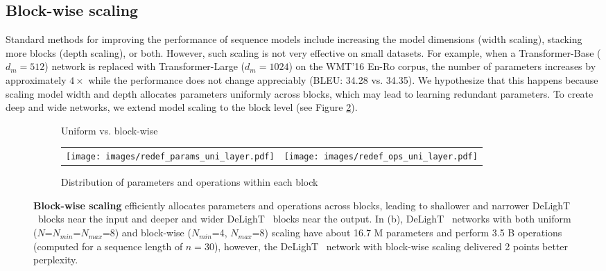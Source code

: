 \subsection{Block-wise scaling}
\label{ssec:layer_wise_scaling}
Standard methods for improving the performance of sequence models include increasing the model dimensions (width scaling), stacking more blocks (depth scaling), or both. However, such scaling is not very effective on small datasets. For example, when a Transformer-Base ($d_m=512$)  network is replaced with Transformer-Large ($d_m=1024$) on the WMT'16 En-Ro corpus, the number of parameters increases by approximately $4\times$ while the performance does not change appreciably (BLEU: 34.28 vs. 34.35). We hypothesize that this happens because scaling model width and depth allocates parameters uniformly across blocks, which may lead to learning redundant parameters. To create deep and wide networks, we extend model scaling to the block level (see Figure \ref{fig:fixed_vs_layer_wise}).
\begin{figure}[t!]
    \centering
    \begin{subfigure}[b]{0.28\columnwidth}
        \centering
        \resizebox{!}{80px}{
            \scaling
        }
        \caption{Uniform vs. block-wise}
        \label{fig:com_tam_ram}
    \end{subfigure}
    \hfill
    \begin{subfigure}[b]{0.7\columnwidth}
        \centering
        \begin{tabular}{cc}
            \texttt{[image: images/redef\_params\_uni\_layer.pdf]} &  \texttt{[image: images/redef\_ops\_uni\_layer.pdf]}
        \end{tabular}
        \caption{Distribution of parameters and operations within each block}
    \end{subfigure}
    \caption{\textbf{Block-wise scaling} efficiently allocates parameters and operations across blocks, leading to shallower and narrower DeLighT ~blocks near the input and deeper and wider DeLighT ~blocks near the output. In (b), DeLighT ~networks with both uniform ($N$=$N_{min}$=$N_{max}$=8) and block-wise ($N_{min}$=4, $N_{max}$=8) scaling have about 16.7 M parameters and perform 3.5 B operations (computed for a sequence length of $n=30$), however, the DeLighT ~network with block-wise scaling delivered 2 points better perplexity.} 
    \label{fig:fixed_vs_layer_wise}
\end{figure}

